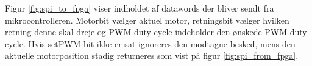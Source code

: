 Figur \ref{fig:spi_to_fpga} viser indholdet af datawords der bliver sendt fra mikrocontrolleren. 
Motorbit vælger aktuel motor, retningsbit vælger hvilken retning
denne skal dreje og PWM-duty cycle indeholder den ønskede PWM-duty cycle. 
Hvis setPWM bit ikke er sat ignoreres den modtagne besked,
mens den aktuelle motorposition stadig returneres som vist på figur \ref{fig:spi_from_fpga}. 

